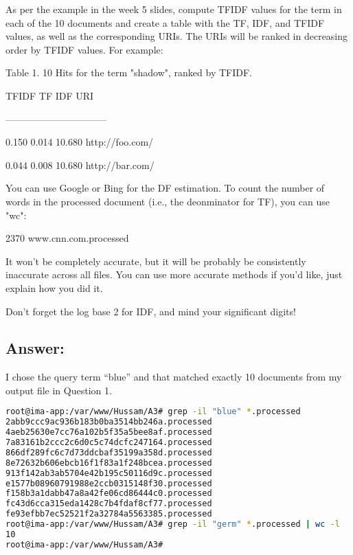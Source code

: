 \documentclass[a4paper, 11pt]{article}
\begin{document}
As per the example in the week 5 slides, compute TFIDF values for
the term in each of the 10 documents and create a table with the
TF, IDF, and TFIDF values, as well as the corresponding URIs.  The
URIs will be ranked in decreasing order by TFIDF values.  For
example:

Table 1. 10 Hits for the term "shadow", ranked by TFIDF.

TFIDF TF IDF URI

--------------------------------

0.150	0.014	10.680	http://foo.com/

0.044	0.008	10.680	http://bar.com/


You can use Google or Bing for the DF estimation.  To count the
number of words in the processed document (i.e., the deonminator
for TF), you can use "wc":

    2370 www.cnn.com.processed

It won't be completely accurate, but it will be probably be
consistently inaccurate across all files.  You can use more 
accurate methods if you'd like, just explain how you did it.  

Don't forget the log base 2 for IDF, and mind your significant
digits!


\subsection*{Answer:}

I chose the query term ``blue'' and that matched exactly 10 documents from my output file in Question 1.

\begin{lstlisting}[language=bash, breakatwhitespace=〈false), label=query term search, caption= Results from searching for the chosen query term]
root@ima-app:/var/www/Hussam/A3# grep -il "blue" *.processed
2abb9ccc9ac936b183b0ba3514bb246a.processed
4aeb25630e7cc76a102b5f35a5bee8af.processed
7a83161b2ccc2c6d0c5c74dcfc247164.processed
866df289fc6c7d73ddcbaf35199a358d.processed
8e72632b606ebcb16f1f83a1f248bcea.processed
913f142ab3ab5704e42b195c50116d9c.processed
e1577b08960791988e2ccb0315148f30.processed
f158b3a1dabb47a8a42fe06cd86444c0.processed
fc43d6cca315eda1428c7b4fdaf8cf77.processed
fe93efbb7ec52521f2a32784a5563385.processed
root@ima-app:/var/www/Hussam/A3# grep -il "germ" *.processed | wc -l
10
root@ima-app:/var/www/Hussam/A3#

\end{lstlisting}
\end{document}
